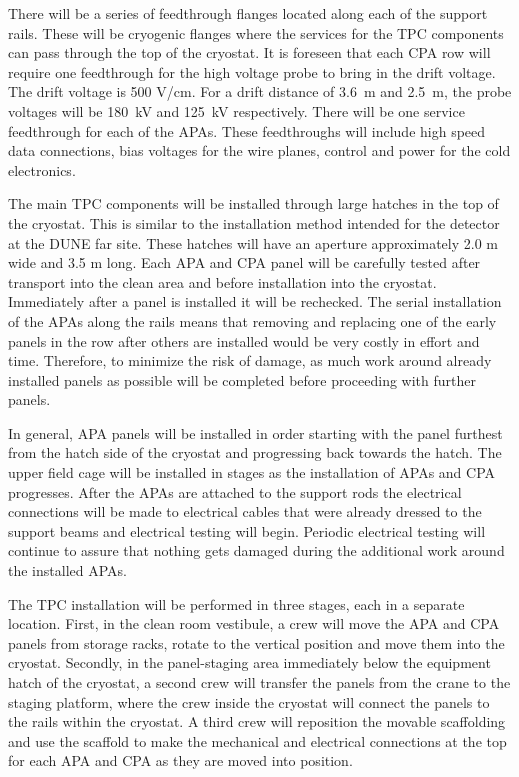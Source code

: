There will be a series of feedthrough flanges located along each of the support rails.  These will be cryogenic flanges where the services for the TPC components can pass through the top of the cryostat.  It is foreseen that each CPA row will require one feedthrough for the high voltage probe to bring in the drift voltage.  The drift voltage is 500 V/cm.  For a drift distance of 3.6~m and 2.5~m, the probe voltages will be 180~kV and 125~kV respectively.  There will be one service feedthrough for each of the APAs.  These feedthroughs will include high speed data connections, bias voltages for the wire planes, control and power for the cold electronics.  

The main TPC components will be installed through large hatches in the top of the cryostat.  This is 
similar to the installation method intended for the detector at the DUNE far site.  These hatches will have an 
aperture approximately 2.0 m wide and 3.5 m long.  Each APA and CPA panel will be carefully tested after transport into the clean area and before installation into the cryostat. Immediately after a panel is installed it will be rechecked. The serial installation of the APAs along the rails means that removing and replacing one of the early panels in the row after others are installed would be very costly in effort and time. Therefore, to minimize the risk of damage, as much work around already installed panels as possible will be completed before proceeding with further panels.
 
In general, APA panels will be installed in order starting with the panel furthest from the hatch side of the cryostat and progressing back towards the hatch. The upper field cage will be installed in stages as the installation of APAs and CPA progresses.  After the APAs are attached to the support rods the electrical connections will be made to electrical cables that were already dressed to the support beams and electrical testing will begin. Periodic electrical testing will continue to assure that nothing gets  damaged during the additional work around the installed APAs.  

The TPC installation will be performed in three stages, each in a separate location. First, in the clean room vestibule, a crew will move the APA and CPA panels from storage racks, rotate to the vertical position and move them into the cryostat. Secondly, in the panel-staging area immediately below the equipment hatch of the cryostat, 
a second crew will transfer the panels from the crane to the staging platform, where the crew inside the cryostat will connect the panels to the rails within the cryostat. A third crew will reposition the movable scaffolding and use the scaffold to make the mechanical and electrical connections at the top for each APA and CPA as they are moved into position.  

